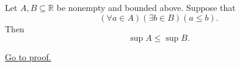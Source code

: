 \begin{proposition}
\label{prop:order-comparison-of-suprema}
Let $A,B\subseteq\mathbb{R}$ be nonempty and bounded above. Suppose that
\[
  (\forall a\in A)(\exists b\in B)(a\leq b).
\]
Then
\[
  \sup A\leq\sup B.
\]

\hyperref[prf:order-comparison-of-suprema]{Go to proof.}
\end{proposition}